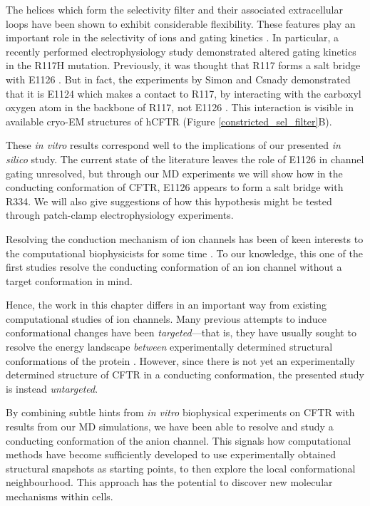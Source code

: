 The helices which form the selectivity filter and their associated extracellular loops have been shown to exhibit considerable flexibility. These features play an important role in the selectivity of ions and gating kinetics \cite{linsdell1998, kim2019, negoda2018, negoda2019}. In particular, a recently performed electrophysiology study demonstrated altered gating kinetics in the R117H mutation. Previously, it was thought that R117 forms a salt bridge with E1126 \cite{cui2014}. But in fact, the experiments by Simon and Csnady demonstrated that it is E1124 which makes a contact to R117, by interacting with the carboxyl oxygen atom in the backbone of R117, not E1126 \cite{simon2021}. This interaction is visible in available cryo-EM structures of hCFTR (Figure \ref{constricted_sel_filter}B). 

These \textit{in vitro} results correspond well to the implications of our presented \textit{in silico} study. The current state of the literature leaves the role of E1126 in channel gating unresolved, but through our MD experiments we will show how in the conducting conformation of CFTR, E1126 appears to form a salt bridge with R334. We will also give suggestions of how this hypothesis might be tested through patch-clamp electrophysiology experiments. 

Resolving the conduction mechanism of ion channels has been of keen interests to the computational biophysicists for some time \cite{black2020, flood2019}. To our knowledge, this one of the first studies resolve the conducting conformation of an ion channel without a target conformation in mind. 

Hence, the work in this chapter differs in an important way from existing computational studies of ion channels. Many previous attempts to induce conformational changes have been \textit{targeted}---that is, they have usually sought to resolve the energy landscape \textit{between} experimentally determined structural conformations of the protein \cite{hoffmann2018, lev2020, bergh2021, mccomas2022}. However, since there is not yet an experimentally determined structure of CFTR in a conducting conformation, the presented study is instead \textit{untargeted}. 

By combining subtle hints from \textit{in vitro} biophysical experiments on CFTR with results from our MD simulations, we have been able to resolve and study a conducting conformation of the anion channel. This signals how computational methods have become sufficiently developed to use experimentally obtained structural snapshots as starting points, to then explore the local conformational neighbourhood. This approach has the potential to discover new molecular mechanisms within cells.

